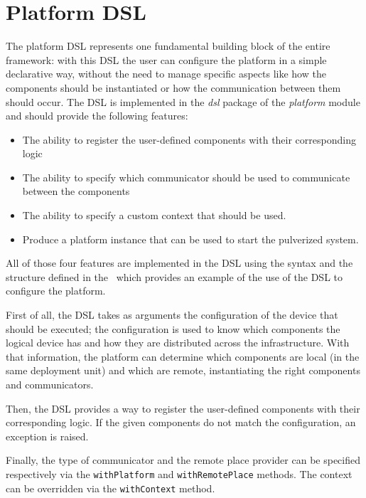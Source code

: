 
\section{Platform DSL}
\label{sec:platform-dsl-impl}

The platform DSL represents one fundamental building block of the entire framework: with this DSL the user can configure the platform in a simple
declarative way, without the need to manage specific aspects like how the components should be instantiated or how the communication between them
should occur. The DSL is implemented in the \emph{dsl} package of the \emph{platform} module and should provide the following features:
\begin{itemize}
	\item The ability to register the user-defined components with their corresponding logic
	\item The ability to specify which communicator should be used to communicate between the components
	\item The ability to specify a custom context that should be used.
	\item Produce a platform instance that can be used to start the pulverized system.
\end{itemize}

All of those four features are implemented in the DSL using the syntax and the structure defined in the~ which provides
an example of the use of the DSL to configure the platform.



First of all, the DSL takes as arguments the configuration of the device that should be executed; the configuration is used to know which components
the logical device has and how they are distributed across the infrastructure. With that information, the platform can determine which components
are local (in the same deployment unit) and which are remote, instantiating the right components and communicators.

Then, the DSL provides a way to register the user-defined components with their corresponding logic. If the given components do not match the
configuration, an exception is raised.

Finally, the type of communicator and the remote place provider can be specified respectively via the \texttt{withPlatform} and
\texttt{withRemotePlace} methods. The context can be overridden via the \texttt{withContext} method.

